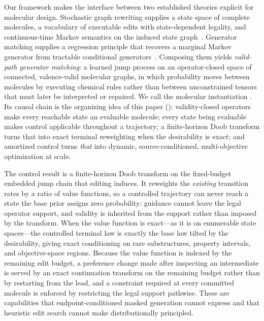 Our framework makes the interface between two established theories explicit for molecular design.
Stochastic graph rewriting supplies a state space of complete molecules, a vocabulary of executable
edits with state-dependent legality, and continuous-time Markov semantics on the induced state
graph~\citep{danos2015thermodynamic,behr2021rewriting}. Generator matching supplies a regression
principle that recovers a marginal Markov generator from tractable conditional
generators~\citep{holderrieth2025generator}. Composing them yields \emph{valid-path generator
matching}: a learned jump process on an operator-closed space of connected, valence-valid molecular
graphs, in which probability moves between molecules by executing chemical rules rather than between
unconstrained tensors that must later be interpreted or repaired. We call the molecular instantiation
\method. Its causal chain is the organizing idea of this paper (): validity-closed
operators make every reachable state an evaluable molecule; every state being evaluable makes control
applicable throughout a trajectory; a finite-horizon Doob transform turns that into exact terminal
reweighting when the desirability is exact; and amortized control turns \emph{that} into dynamic,
source-conditioned, multi-objective optimization at scale.



The control result is a finite-horizon Doob transform on the fixed-budget embedded jump chain that
editing induces. It reweights the \emph{existing} transition rates by a ratio of value functions, so
a controlled trajectory can never reach a state the base prior assigns zero probability: guidance
cannot leave the legal operator support, and validity is inherited from the support rather than
imposed by the transform. When the value function is exact---as it is on enumerable state
spaces---the controlled terminal law is exactly the base law tilted by the desirability, giving exact
conditioning on rare substructures, property intervals, and objective-space regions. Because the value
function is indexed by the remaining edit budget, a preference change made after inspecting an
intermediate is served by an exact continuation transform on the remaining budget rather than by
restarting from the lead, and a constraint required at every committed molecule is enforced by
restricting the legal support pathwise. These are capabilities that endpoint-conditioned masked
generation cannot express and that heuristic edit search cannot make distributionally principled.

